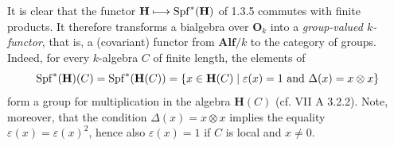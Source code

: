 It is clear that the functor $\mathbf H\longmapsto\operatorname{Spf}^*(\mathbf H)$ of 1.3.5 commutes with finite products. It therefore transforms a bialgebra over $\mathbf O_k$ into a \emph{group-valued $k$-functor}, that is, a (covariant) functor from $\mathbf{Alf}/k$ to the category of groups.
Indeed, for every $k$-algebra $C$ of finite length, the elements of
\[
\operatorname{Spf}^*(\mathbf H)(C)=\operatorname{Spf}^*(\mathbf H(C))=\{x\in\mathbf H(C)\mid\varepsilon(x)=1\ \text{and }\Delta(x)=x\otimes x\}
\]
form a group for multiplication in the algebra $\mathbf H(C)$ (cf. VII A 3.2.2). Note, moreover, that the condition $\Delta(x)=x\otimes x$ implies the equality $\varepsilon(x)=\varepsilon(x)^2$, hence also $\varepsilon(x)=1$ if $C$ is local and $x\ne0$.

